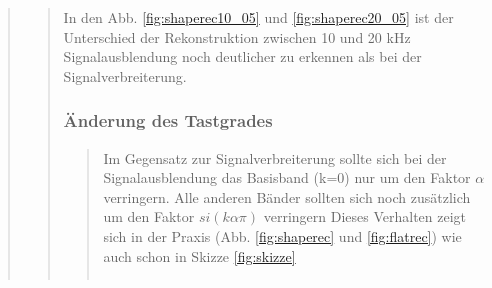 \begin{quote}
\begin{quote}
        In den Abb. \ref{fig:shaperec10_05} und \ref{fig:shaperec20_05} ist der Unterschied der Rekonstruktion zwischen
        10 und 20 kHz Signalausblendung noch deutlicher zu erkennen als bei der Signalverbreiterung.
        
        
        \subsubsection{Änderung des Tastgrades}
        \begin{quote}
            
                      
             Im Gegensatz zur Signalverbreiterung sollte sich bei der Signalausblendung das Basisband (k=0) nur um den
             Faktor $\alpha$ verringern.
             Alle anderen Bänder sollten sich noch zusätzlich um den Faktor $si(k\alpha\pi)$ verringern%
             Dieses Verhalten zeigt sich in der Praxis (Abb. \ref{fig:shaperec} und \ref{fig:flatrec}) wie auch schon
             in Skizze \ref{fig:skizze}
             
             
             
             
            \begin{center}
            \begin{tabular}{ll}
            

\end{tabular}
\end{center}
\end{quote}
\end{quote}
\end{quote}
